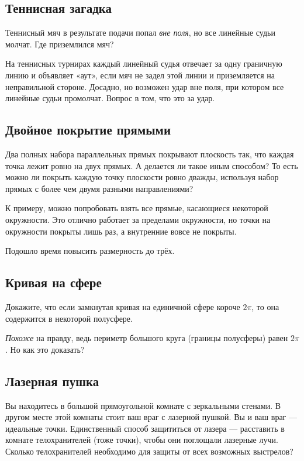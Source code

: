 \subsection*{Теннисная загадка}

Теннисный мяч в результате подачи попал \emph{вне поля}, но все линейные судьи молчат.
Где приземлился мяч?

На теннисных турнирах каждый линейный судья отвечает за одну граничную линию и объявляет «аут», если мяч не задел этой линии и приземляется на неправильной стороне.
Досадно, но возможен удар вне поля, при котором все линейные судьи промолчат.
Вопрос в том, что это за удар.

\subsection*{Двойное покрытие прямыми}

Два полных набора параллельных прямых покрывают плоскость так, что каждая точка лежит ровно на двух прямых.
А делается ли такое иным способом?
То есть можно ли покрыть каждую точку плоскости ровно дважды, используя набор прямых с более чем двумя разными направлениями?

 К примеру, можно попробовать взять все прямые, касающиеся некоторой окружности.
Это отлично работает за пределами окружности, но точки на окружности покрыты лишь раз, а внутренние вовсе не покрыты.

\medskip

Подошло время повысить размерность до трёх.

\subsection*{Кривая на сфере}

Докажите, что если замкнутая кривая на единичной сфере короче $2\pi$, то она содержится в некоторой полусфере.

 \emph{Похоже} на правду, ведь периметр большого круга (границы полусферы) равен $2\pi$.
Но как это доказать?

\subsection*{Лазерная пушка}

Вы находитесь в большой прямоугольной комнате с зеркальными стенами.
В другом месте этой комнаты стоит ваш враг с лазерной пушкой.
Вы и ваш враг --- идеальные точки.
Единственный способ защититься от лазера --- расставить в комнате телохранителей (тоже точки), чтобы они поглощали лазерные лучи.
Сколько телохранителей необходимо для защиты от всех возможных выстрелов?

